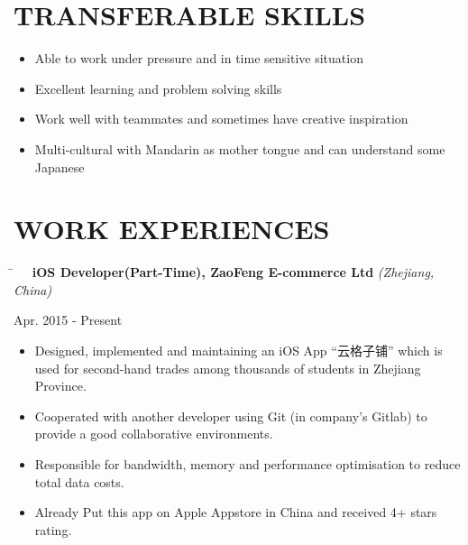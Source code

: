 \documentclass[10pt]{article} %
\begin{document}

\section{TRANSFERABLE SKILLS}
\begin{itemize}
	\item Able to work under pressure and in time sensitive situation
	\item Excellent learning and problem solving skills
	\item Work well with teammates and sometimes have creative inspiration
	\item Multi-cultural with Mandarin as mother tongue and can understand some Japanese
\end{itemize}


\section{WORK EXPERIENCES}
\vspace{-2mm}
\parbox{0.5\textwidth}{ %
\begin{tabbing}
\hspace{4mm} \= \kill
\>\textbf{\ \ iOS Developer(Part-Time), ZaoFeng E-commerce Ltd} \textit{(Zhejiang, China)}
\end{tabbing}
}
\hfill
\parbox{0.5\textwidth}{
\begin{tabbing}
Apr. 2015 - Present
\end{tabbing}
}
\vspace{-3mm}
\begin{itemize}[leftmargin=16mm]        
        \item Designed, implemented and maintaining an iOS App ``云格子铺'' which is used for second-hand trades among thousands of students in Zhejiang Province.
        \item Cooperated with another developer using Git (in company's Gitlab) to provide a good collaborative environments.
        \item Responsible for bandwidth, memory and performance optimisation to reduce total data costs.
        \item Already Put this app on Apple Appstore in China and received 4+ stars rating.
\end{itemize}
\end{document}
